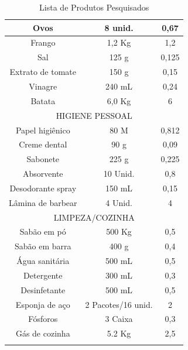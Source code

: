 \documentclass{ifto-tex}
\begin{document}
\begin{longtable}{|c|c|c|}
			\hline
			Ovos              & 8 unid.            & 0,67            \\
			\hline
			Frango            & 1,2 Kg             & 1,2             \\
			\hline
			Sal               & 125 g              & 0,125           \\
			\hline
			Extrato de tomate & 150 g              & 0,15            \\
			\hline
			Vinagre           & 240 mL             & 0,24            \\
			\hline
			Batata            & 6,0 Kg             & 6               \\
			\hline
			\multicolumn{3}{|c|}{HIGIENE PESSOAL}                      \\
			\hline
			Papel higiênico   & 80 M               & 0,812           \\
			\hline
			Creme dental      & 90 g               & 0,09            \\
			\hline
			Sabonete          & 225 g              & 0,225           \\
			\hline
			Absorvente        & 10 Unid.           & 0,8             \\
			\hline
			Desodorante spray & 150 mL             & 0,15            \\
			\hline
			Lâmina de barbear & 4 Unid.            & 4               \\
			\hline
			\multicolumn{3}{|c|}{LIMPEZA/COZINHA}                      \\
			\hline
			Sabão em pó       & 500 Kg             & 0,5             \\
			\hline
			Sabão em barra    & 400 g              & 0,4             \\
			\hline
			Água sanitária    & 500 mL             & 0,5             \\
			\hline
			Detergente        & 300 mL             & 0,3             \\
			\hline
			Desinfetante      & 500 mL             & 0,5             \\
			\hline
			Esponja de aço    & 2 Pacotes/16 unid. & 2               \\
			\hline
			Fósforos          & 3 Caixa            & 0,3             \\
			\hline
			Gás de cozinha    & 5.2 Kg             & 2,5       \\
			\hline     
	\caption{Lista de Produtos Pesquisados}
	\end{longtable}
	
\end{document}
